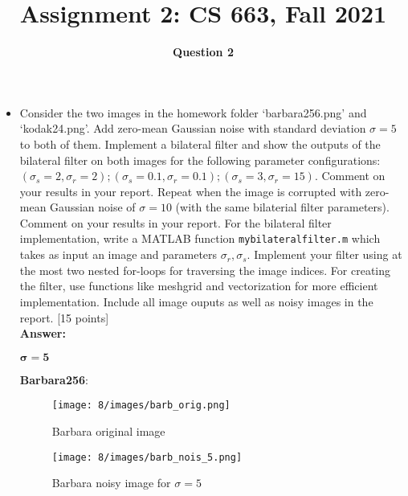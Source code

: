 \documentclass[12pt]{article}
\title{Assignment 2: CS 663, Fall 2021}
\author{\textbf{Question 2}}
\date{}
\begin{document}
\maketitle

\begin{itemize}
    \item Consider the two images in the homework folder `barbara256.png' and `kodak24.png'. Add zero-mean Gaussian noise with standard deviation $\sigma = 5$ to both of them. Implement a bilateral filter and show the outputs of the bilateral filter on both images for the following parameter configurations: $(\sigma_s = 2, \sigma_r = 2); (\sigma_s = 0.1, \sigma_r = 0.1); (\sigma_s = 3, \sigma_r = 15)$. Comment on your results in your report. Repeat when the image is corrupted with zero-mean Gaussian noise of $\sigma = 10$ (with the same bilaterial filter parameters). Comment on your results in your report. For the bilateral filter implementation, write a MATLAB function \texttt{mybilateralfilter.m} which takes as input an image and parameters $\sigma_r, \sigma_s$. Implement your filter using at the most two nested for-loops for traversing the image indices. For creating the filter, use functions like meshgrid and vectorization for more efficient implementation. Include all image ouputs as well as noisy images in the report. \textsf{[15 points]}
    \vspace*{0.5cm}\\
    \textbf{Answer:}
    \begin{center}
        $\mathbf{\bm{\sigma} = 5}$
    \end{center}
    \textbf{Barbara256}:
    
    \begin{figure}[H]
        \centering
        \begin{minipage}{.45\textwidth}
          \centering
          \texttt{[image: 8/images/barb\_orig.png]}
          \caption*{Barbara original image}
          \label{fig:totalpowervst}
        \end{minipage}
        \begin{minipage}{.45\textwidth}
          \centering
          \texttt{[image: 8/images/barb\_nois\_5.png]}
          \caption*{Barbara noisy image for $\sigma = 5$}
          \label{fig:totalpower2}
        \end{minipage}
        \label{fig:totalPower}
    \end{figure}
    

\end{itemize}
\end{document}
